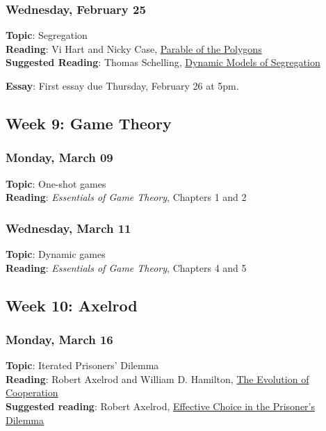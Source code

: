 \documentclass[
  letterpaper,
  DIV=11,
  numbers=noendperiod]{scrartcl}
\begin{document}
\subsubsection{Wednesday, February 25}\label{wednesday-february-25}

\textbf{Topic}: Segregation\\
\textbf{Reading}: Vi Hart and Nicky Case,
\href{https://ncase.me/polygons/}{Parable of the Polygons}\\
\textbf{Suggested Reading}: Thomas Schelling,
\href{https://www.stat.berkeley.edu/~aldous/157/Papers/Schelling_Seg_Models.pdf}{Dynamic
Models of Segregation}

\textbf{Essay}: First essay due Thursday, February 26 at 5pm.

\subsection{Week 9: Game Theory}\label{week-9-game-theory}

\subsubsection{Monday, March 09}\label{monday-march-09}

\textbf{Topic}: One-shot games\\
\textbf{Reading}: \emph{Essentials of Game Theory}, Chapters 1 and 2

\subsubsection{Wednesday, March 11}\label{wednesday-march-11}

\textbf{Topic}: Dynamic games\\
\textbf{Reading}: \emph{Essentials of Game Theory}, Chapters 4 and 5

\subsection{Week 10: Axelrod}\label{week-10-axelrod}

\subsubsection{Monday, March 16}\label{monday-march-16}

\textbf{Topic}: Iterated Prisoners' Dilemma\\
\textbf{Reading}: Robert Axelrod and William D. Hamilton,
\href{https://websites.umich.edu/~axe/research/Axelrod\%20and\%20Hamilton\%20EC\%201981.pdf}{The
Evolution of Cooperation}\\
\textbf{Suggested reading}: Robert Axelrod,
\href{https://esp.mit.edu/download/2dd80247-be60-4e73-b49d-91b5b6988ff0/S12850_axelrod_1980.pdf}{Effective
Choice in the Prisoner's Dilemma}
\end{document}
